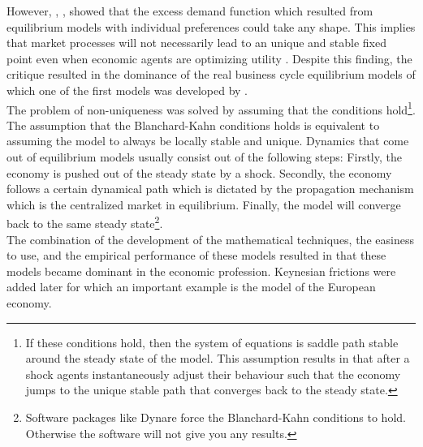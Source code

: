 However, \cite{sonnenschein_market_1972}, \cite{debreu_economies_1970}, \cite{mantel_characterization_1974} showed that the excess demand function which resulted from equilibrium models with individual preferences could take any shape. This implies that market processes will not necessarily lead to an unique and stable fixed point even when economic agents are optimizing utility \citep{ackerman_still_2002}. Despite this finding, the \cite{lucas_econometric_1976} critique resulted in the dominance of the real business cycle equilibrium models of which one of the first models was developed by \cite{kydland_time_1982}. \\

The problem of non-uniqueness was solved by assuming that the \cite{blanchard_solution_1980} conditions hold\footnote{If these conditions hold, then the system of equations is saddle path stable around the steady state of the model. This assumption results in that after a shock agents instantaneously adjust their behaviour such that the economy jumps to the unique stable path that converges back to the steady state.}. The assumption that the Blanchard-Kahn conditions holds is equivalent to assuming the model to always be locally stable and unique. Dynamics that come out of equilibrium models usually consist out of the following steps: Firstly, the economy is pushed out of the steady state by a shock. Secondly, the economy follows a certain dynamical path which is dictated by the propagation mechanism which is the centralized market in equilibrium. Finally, the model will converge back to the same steady state\footnote{Software packages like Dynare force the Blanchard-Kahn conditions to hold. Otherwise the software will not give you any results.}.\\

The combination of the development of the mathematical techniques, the easiness to use, and the empirical performance of these models resulted in that these models became dominant in the economic profession. Keynesian frictions were added later for which an important example is the \cite{smets_shocks_2007} model of the European economy.\\

